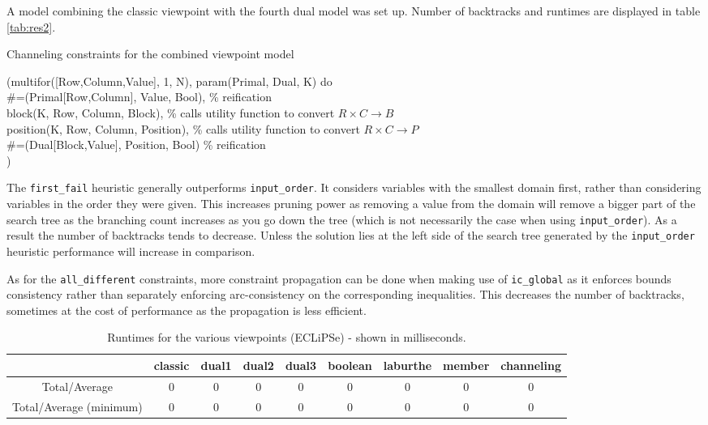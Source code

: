 A model combining the classic viewpoint with the fourth dual model was set up. Number of backtracks and runtimes are displayed in table \ref{tab:res2}.

\begin{snippet}[H]
\caption{Channeling constraints for the combined viewpoint model}\label{channeling}
\small
(multifor([Row,Column,Value], 1, N), param(Primal, Dual, K) do \\
    \qquad\#=(Primal[Row,Column], Value, Bool), \% reification \\
    \qquad block(K, Row, Column, Block), \% calls utility function to convert $R\times C\rightarrow B$ \\
    \qquad position(K, Row, Column, Position), \% calls utility function to convert $R\times C\rightarrow P$ \\
    \qquad\#=(Dual[Block,Value], Position, Bool) \% reification\\
)
\end{snippet}

The \texttt{first\_fail} heuristic generally outperforms \texttt{input\_order}. It considers variables with the smallest domain first, rather than considering variables in the order they were given. This increases pruning power as removing a value from the domain will remove a bigger part of the search tree as the branching count increases as you go down the tree (which is not necessarily the case when using \texttt{input\_order}). As a result the number of backtracks tends to decrease. Unless the solution lies at the left side of the search tree generated by the \texttt{input\_order} heuristic performance will increase in comparison. \\\par

As for the \texttt{all\_different} constraints, more constraint propagation can be done when making use of \texttt{ic\_global} as it enforces bounds consistency rather than separately enforcing arc-consistency on the corresponding inequalities. This decreases the number of backtracks, sometimes at the cost of performance as the propagation is less efficient.

\begin{table}[h]
\bgroup
\def\arraystretch{1.3}
\begin{tabular}{ccccccccc}
\multicolumn{1}{l}{}    & classic & dual1 & dual2 & dual3 & boolean & laburthe & member & channeling \\ \hline
Total/Average & 0 & 0 & 0 & 0 & 0 & 0 & 0 & 0 \\
Total/Average (minimum) & 0 & 0 & 0 & 0 & 0 & 0 & 0 & 0                    
\end{tabular}
\egroup
\caption{Runtimes for the various viewpoints (ECLiPSe) - shown in milliseconds.}
\label{tab:res1}
\end{table}


